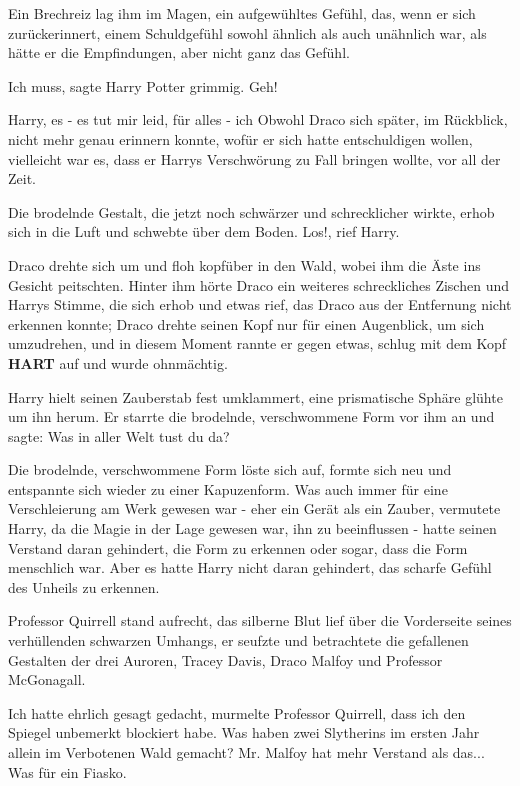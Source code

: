 Ein Brechreiz lag ihm im Magen, ein aufgewühltes Gefühl, das, wenn er sich
zurückerinnert, einem Schuldgefühl sowohl ähnlich als auch unähnlich war,
als hätte er die Empfindungen, aber nicht ganz das Gefühl.

\glqq{}Ich muss\grqq{}, sagte Harry Potter grimmig. \glqq{}Geh!\grqq{}

\glqq{}Harry, es - es tut mir leid, für alles - ich\grqq{} Obwohl Draco sich
später, im Rückblick, nicht mehr genau erinnern konnte, wofür er sich
hatte entschuldigen wollen, vielleicht war es, dass er Harrys
Verschwörung zu Fall bringen wollte, vor all der Zeit.

Die brodelnde Gestalt, die jetzt noch schwärzer und schrecklicher wirkte, erhob
sich in die Luft und schwebte über dem Boden. \glqq{}Los!\grqq{}, rief
Harry.

Draco drehte sich um und floh kopfüber in den Wald, wobei ihm die Äste ins
Gesicht peitschten. Hinter ihm hörte Draco ein weiteres schreckliches
Zischen und Harrys Stimme, die sich erhob und etwas rief, das Draco aus
der Entfernung nicht erkennen konnte; Draco drehte seinen Kopf nur für
einen Augenblick, um sich umzudrehen, und in diesem Moment rannte er
gegen etwas, schlug mit dem Kopf \textbf{HART} auf und wurde ohnmächtig.

Harry hielt seinen Zauberstab fest umklammert, eine prismatische Sphäre glühte
um ihn herum. Er starrte die brodelnde, verschwommene Form vor ihm an und
sagte: \glqq{}Was in aller Welt tust du da?\grqq{}

Die brodelnde, verschwommene Form löste sich auf, formte sich neu und entspannte
sich wieder zu einer Kapuzenform. Was auch immer für eine Verschleierung
am Werk gewesen war - eher ein Gerät als ein Zauber, vermutete Harry, da
die Magie in der Lage gewesen war, ihn zu beeinflussen - hatte seinen
Verstand daran gehindert, die Form zu erkennen oder sogar, dass die Form
menschlich war. Aber es hatte Harry nicht daran gehindert, das scharfe
Gefühl des Unheils zu erkennen.

Professor Quirrell stand aufrecht, das silberne Blut lief über die Vorderseite
seines verhüllenden schwarzen Umhangs, er seufzte und betrachtete die
gefallenen Gestalten der drei Auroren, Tracey Davis, Draco Malfoy und
Professor McGonagall.

\glqq{}Ich hatte ehrlich gesagt gedacht\grqq{}, murmelte Professor Quirrell,
\glqq{}dass ich den Spiegel unbemerkt blockiert habe. Was haben zwei
Slytherins im ersten Jahr allein im Verbotenen Wald gemacht? Mr. Malfoy
hat mehr Verstand als das... Was für ein Fiasko.\grqq{}

